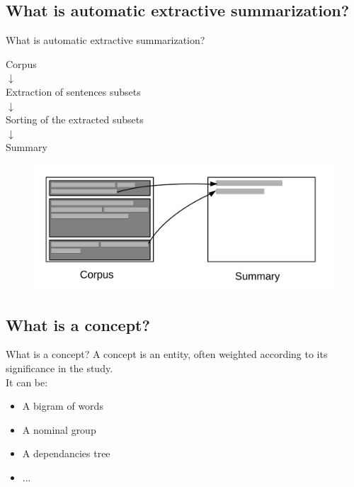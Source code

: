 \documentclass[xcolor=x11names,compress]{beamer}
\renewcommand{\(}{\begin{columns}}
\renewcommand{\)}{\end{columns}}
\newcommand{\<}[1]{\begin{column}{#1}}
\renewcommand{\>}{\end{column}}
\begin{document}
\subsection{What is automatic extractive summarization?}
\begin{frame}{What is automatic extractive summarization?}
\begin{center}
Corpus\\$\downarrow$\\ Extraction of sentences subsets \\ $\downarrow$ \\Sorting of the extracted subsets \\$\downarrow$ \\Summary

\begin{figure}[!h]
	\includegraphics[scale=0.2]{first.png}
\end{figure}

\end{center}
\end{frame}
\subsection{What is a concept?}
\begin{frame}{What is a concept?}
A concept is an entity, often weighted according to its significance in the study.\\
\vspace{1cm}
It can be:
\begin{itemize}
\item A bigram of words
\item A nominal group
\item A dependancies tree
\item ...
\end{itemize}
\end{frame}
\end{document}

